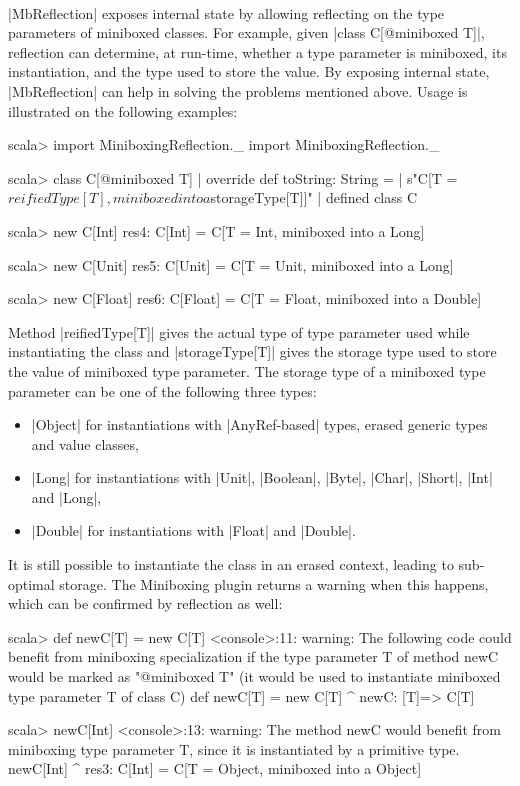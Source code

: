 \paragraph{}
|MbReflection| exposes internal state by allowing reflecting on the type parameters of miniboxed classes. For example, given |class C[@miniboxed T]|, reflection can determine, at run-time, whether a type parameter is miniboxed, its instantiation, and the type used to store the value. By exposing internal state, |MbReflection| can help in solving the problems mentioned above. Usage is illustrated 	on the following examples:
\begin{lstlisting-nobreak}
scala> import MiniboxingReflection._
	import MiniboxingReflection._

scala> class C[@miniboxed T] {
    |   override def toString: String =
    |     s"C[T =${reifiedType[T]}, miniboxed into a ${storageType[T]}]"
    | }
	defined class C

scala> new C[Int]
	res4: C[Int] = C[T = Int, miniboxed into a Long]

scala> new C[Unit]
	res5: C[Unit] = C[T = Unit, miniboxed into a Long]

scala> new C[Float]
	res6: C[Float] = C[T = Float, miniboxed into a Double]
\end{lstlisting-nobreak}

Method |reifiedType[T]| gives the actual type of type parameter used while instantiating the class and |storageType[T]| gives the storage type used to store the value of miniboxed type parameter. The storage type of a miniboxed type parameter can be one of the following three types:
\begin{itemize}
	\item |Object| for instantiations with |AnyRef-based| types, erased generic types and value classes,
	\item |Long| for instantiations with |Unit|, |Boolean|, |Byte|, |Char|, |Short|, |Int| and |Long|,
	\item |Double| for instantiations with |Float| and |Double|.
\end{itemize}
It is still possible to instantiate the class in an erased context, leading to sub-optimal storage. The Miniboxing plugin returns a warning when this happens, which can be confirmed by reflection as well:

\begin{lstlisting-nobreak}
scala> def newC[T] = new C[T]
<console>:11: warning: The following code could benefit from miniboxing
     specialization if the type parameter T of method newC would be marked
     as "@miniboxed T" (it would be used to instantiate miniboxed type
     parameter T of class C)
            def newC[T] = new C[T]
                          ^
     newC: [T]=> C[T]

scala> newC[Int]
<console>:13: warning: The method newC would benefit from miniboxing
     type parameter T, since it is instantiated by a primitive type.
                   newC[Int]
                       ^
	res3: C[Int] = C[T = Object, miniboxed into a Object]
\end{lstlisting-nobreak}


